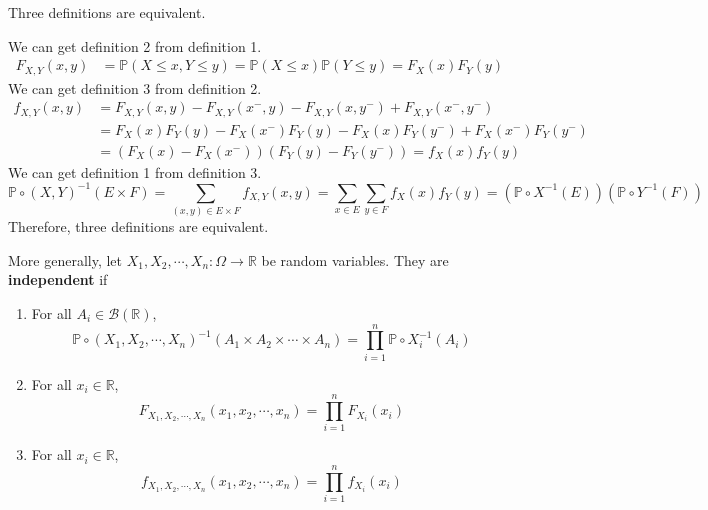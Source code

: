 \documentclass{huhtakm-template-book}
\newcommand{\prob}{\mathbb{P}}
\begin{document}
    \newpage
    \begin{cla}
        Three definitions are equivalent.
    \end{cla}
    \begin{proofing}
        We can get definition 2 from definition 1.
        \begin{align*}
            F_{X,Y}(x,y)&=\prob(X\leq x,Y\leq y)=\prob(X\leq x)\prob(Y\leq y)=F_{X}(x)F_{Y}(y)
        \end{align*}
        We can get definition 3 from definition 2.
        \begin{align*}
            f_{X,Y}(x,y)&=F_{X,Y}(x,y)-F_{X,Y}(x^{-},y)-F_{X,Y}(x,y^{-})+F_{X,Y}(x^{-},y^{-})\\
            &=F_{X}(x)F_{Y}(y)-F_{X}(x^{-})F_{Y}(y)-F_{X}(x)F_{Y}(y^{-})+F_{X}(x^{-})F_{Y}(y^{-})\\
            &=(F_{X}(x)-F_{X}(x^{-}))(F_{Y}(y)-F_{Y}(y^{-}))=f_{X}(x)f_{Y}(y)
        \end{align*}
        We can get definition 1 from definition 3.
        \begin{equation*}
            \prob\circ(X,Y)^{-1}(E\times F)=\sum_{(x,y)\in E\times F}f_{X,Y}(x,y)=\sum_{x\in E}\sum_{y\in F}f_{X}(x)f_{Y}(y)=(\prob\circ X^{-1}(E))(\prob\circ Y^{-1}(F))
        \end{equation*}
        Therefore, three definitions are equivalent.
    \end{proofing}
    \begin{rem}
        More generally, let $X_{1},X_{2},\cdots,X_{n}:\Omega\to\mathbb{R}$ be random variables. They are \textbf{independent} if
        \begin{enumerate}
            \item For all $A_{i}\in\mathcal{B}(\mathbb{R})$,
            \begin{equation*}
                \prob\circ(X_{1},X_{2},\cdots,X_{n})^{-1}(A_{1}\times A_{2}\times\cdots\times A_{n})=\prod_{i=1}^{n}\prob\circ X_{i}^{-1}(A_{i})
            \end{equation*}
            \item For all $x_{i}\in\mathbb{R}$,
            \begin{equation*}
                F_{X_{1},X_{2},\cdots,X_{n}}(x_{1},x_{2},\cdots,x_{n})=\prod_{i=1}^{n}F_{X_{i}}(x_{i})
            \end{equation*}
            \item For all $x_{i}\in\mathbb{R}$,
            \begin{equation*}
                f_{X_{1},X_{2},\cdots,X_{n}}(x_{1},x_{2},\cdots,x_{n})=\prod_{i=1}^{n}f_{X_{i}}(x_{i})
            \end{equation*}
        \end{enumerate}
    \end{rem}
\end{document}
